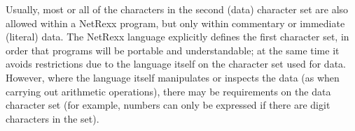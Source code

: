 Usually, most or all of the characters in the second (data) character
set are also allowed within a NetRexx program, but only within
commentary or immediate (literal) data.
 The NetRexx language explicitly defines the first character set, in
order that programs will be portable and understandable; at the same
time it avoids restrictions due to the language itself on the character
set used for data.
However, where the language itself manipulates or inspects the data (as
when carrying out arithmetic operations), there may be requirements on
the data character set (for example, numbers can only be expressed if
there are digit characters in the set).
